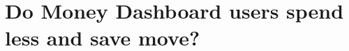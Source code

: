 
\chapter{Do Money Dashboard users spend less and save move?}%
\label{cha:eval}






\begin{subappendices}
 
\end{subappendices}

